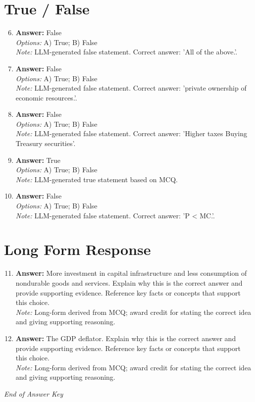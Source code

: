 \documentclass[12pt]{article}
\begin{document}
\section*{True / False}
\begin{enumerate}[label=\arabic*.]
\setcounter{enumi}{5}
\item \textbf{Answer:} False
\\ \textit{Options:} A) True; B) False
\\ \textit{Note:} LLM-generated false statement. Correct answer: 'All of the above.'.
\item \textbf{Answer:} False
\\ \textit{Options:} A) True; B) False
\\ \textit{Note:} LLM-generated false statement. Correct answer: 'private ownership of economic resources.'.
\item \textbf{Answer:} False
\\ \textit{Options:} A) True; B) False
\\ \textit{Note:} LLM-generated false statement. Correct answer: 'Higher taxes Buying Treasury securities'.
\item \textbf{Answer:} True
\\ \textit{Options:} A) True; B) False
\\ \textit{Note:} LLM-generated true statement based on MCQ.
\item \textbf{Answer:} False
\\ \textit{Options:} A) True; B) False
\\ \textit{Note:} LLM-generated false statement. Correct answer: 'P \textless{} MC.'.
\end{enumerate}

\section*{Long Form Response}
\begin{enumerate}[label=\arabic*.]
\setcounter{enumi}{10}
\item \textbf{Answer:} More investment in capital infrastructure and less consumption of nondurable goods and services. Explain why this is the correct answer and provide supporting evidence. Reference key facts or concepts that support this choice.
\\ \textit{Note:} Long-form derived from MCQ; award credit for stating the correct idea and giving supporting reasoning.
\item \textbf{Answer:} The GDP deflator. Explain why this is the correct answer and provide supporting evidence. Reference key facts or concepts that support this choice.
\\ \textit{Note:} Long-form derived from MCQ; award credit for stating the correct idea and giving supporting reasoning.
\end{enumerate}

\vfill
\noindent\textit{End of Answer Key}
\end{document}

